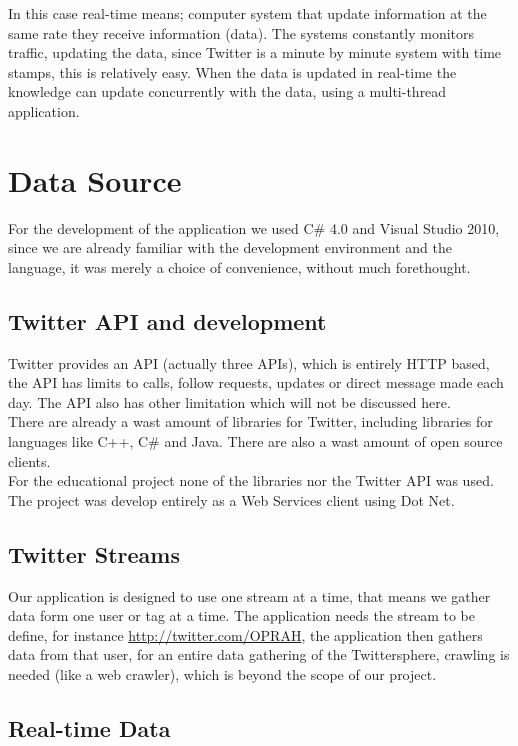 \documentclass[]{article}  %
\begin{document}
In this case real-time means; computer system that update information at the same rate they receive information (data). The systems constantly monitors traffic, updating the data, since Twitter is a minute by minute system with time stamps, this is relatively  easy. When the data is updated in real-time the knowledge can update concurrently with the data, using a multi-thread application.

\section{Data Source}

For the development of the application we used C\# 4.0 and Visual Studio 2010, since we are already familiar with the development environment and the language, it was merely a choice of convenience, without much forethought.

\subsection{Twitter API and development}

Twitter provides an API (actually three APIs), which is entirely HTTP based, the API has limits to calls, follow requests, updates or direct message made each day. The API also has other limitation which will not be discussed here. \\ There are already a wast amount of libraries for Twitter, including libraries for languages like C++, C\# and Java. There are also a wast amount of open source clients. \\ For the educational project none of the libraries nor the Twitter API was used. The project was develop entirely as a  Web Services client using Dot Net.

\subsection{Twitter Streams}

Our application is designed to use one stream at a time, that means we gather data form one user or tag at a time. The application needs the stream to be define, for instance \url{http://twitter.com/OPRAH}, the application then gathers data from that user, for an entire data gathering of the Twittersphere, crawling is needed (like a web crawler), which is beyond the scope of our project.

\subsection{Real-time Data}
\end{document}
